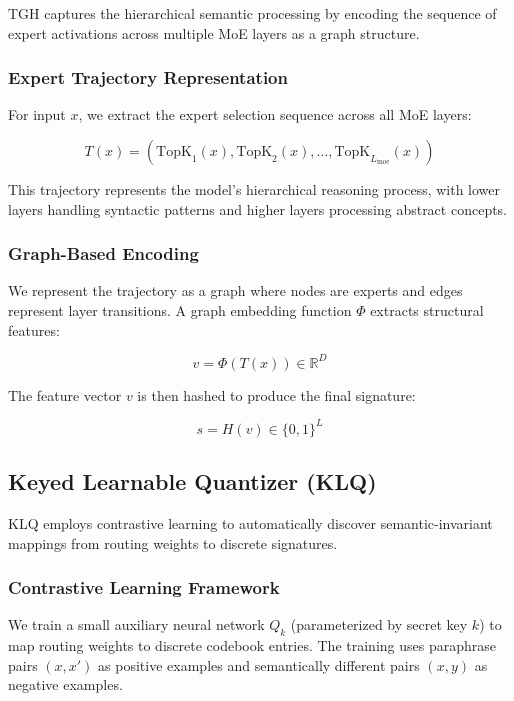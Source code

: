 TGH captures the hierarchical semantic processing by encoding the sequence of expert activations across multiple MoE layers as a graph structure.

\subsubsection{Expert Trajectory Representation}

For input $x$, we extract the expert selection sequence across all MoE layers:

\begin{equation}
T(x) = (\text{TopK}_1(x), \text{TopK}_2(x), \ldots, \text{TopK}_{L_{\text{moe}}}(x))
\end{equation}

This trajectory represents the model's hierarchical reasoning process, with lower layers handling syntactic patterns and higher layers processing abstract concepts.

\subsubsection{Graph-Based Encoding}

We represent the trajectory as a graph where nodes are experts and edges represent layer transitions. A graph embedding function $\Phi$ extracts structural features:

\begin{equation}
v = \Phi(T(x)) \in \mathbb{R}^D
\end{equation}

The feature vector $v$ is then hashed to produce the final signature:

\begin{equation}
s = H(v) \in \{0,1\}^L
\end{equation}

\subsection{Keyed Learnable Quantizer (KLQ)}

KLQ employs contrastive learning to automatically discover semantic-invariant mappings from routing weights to discrete signatures.

\subsubsection{Contrastive Learning Framework}

We train a small auxiliary neural network $Q_k$ (parameterized by secret key $k$) to map routing weights to discrete codebook entries. The training uses paraphrase pairs $(x, x')$ as positive examples and semantically different pairs $(x, y)$ as negative examples.

